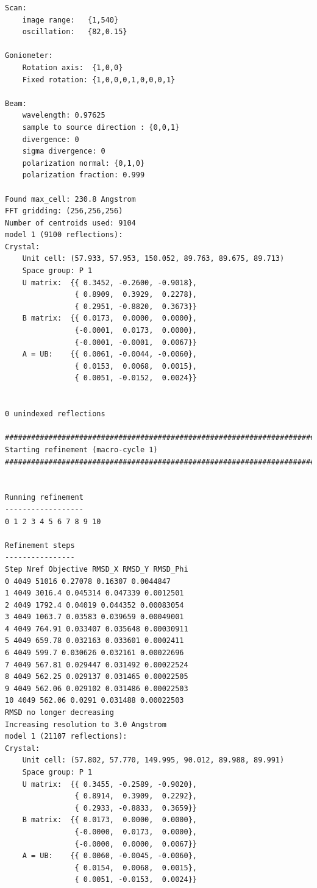 \documentclass[a4paper, 11pt]{article}
\begin{document}
{\begin{verbatim}
Scan:
    image range:   {1,540}
    oscillation:   {82,0.15}

Goniometer:
    Rotation axis:  {1,0,0}
    Fixed rotation: {1,0,0,0,1,0,0,0,1}

Beam:
    wavelength: 0.97625
    sample to source direction : {0,0,1}
    divergence: 0
    sigma divergence: 0
    polarization normal: {0,1,0}
    polarization fraction: 0.999

Found max_cell: 230.8 Angstrom
FFT gridding: (256,256,256)
Number of centroids used: 9104
model 1 (9100 reflections):
Crystal:
    Unit cell: (57.933, 57.953, 150.052, 89.763, 89.675, 89.713)
    Space group: P 1
    U matrix:  {{ 0.3452, -0.2600, -0.9018},
                { 0.8909,  0.3929,  0.2278},
                { 0.2951, -0.8820,  0.3673}}
    B matrix:  {{ 0.0173,  0.0000,  0.0000},
                {-0.0001,  0.0173,  0.0000},
                {-0.0001, -0.0001,  0.0067}}
    A = UB:    {{ 0.0061, -0.0044, -0.0060},
                { 0.0153,  0.0068,  0.0015},
                { 0.0051, -0.0152,  0.0024}}


0 unindexed reflections

################################################################################
Starting refinement (macro-cycle 1)
################################################################################


Running refinement
------------------
0 1 2 3 4 5 6 7 8 9 10

Refinement steps
----------------
Step Nref Objective RMSD_X RMSD_Y RMSD_Phi
0 4049 51016 0.27078 0.16307 0.0044847 
1 4049 3016.4 0.045314 0.047339 0.0012501 
2 4049 1792.4 0.04019 0.044352 0.00083054 
3 4049 1063.7 0.03583 0.039659 0.00049001 
4 4049 764.91 0.033407 0.035648 0.00030911 
5 4049 659.78 0.032163 0.033601 0.0002411 
6 4049 599.7 0.030626 0.032161 0.00022696 
7 4049 567.81 0.029447 0.031492 0.00022524 
8 4049 562.25 0.029137 0.031465 0.00022505 
9 4049 562.06 0.029102 0.031486 0.00022503 
10 4049 562.06 0.0291 0.031488 0.00022503 
RMSD no longer decreasing
Increasing resolution to 3.0 Angstrom
model 1 (21107 reflections):
Crystal:
    Unit cell: (57.802, 57.770, 149.995, 90.012, 89.988, 89.991)
    Space group: P 1
    U matrix:  {{ 0.3455, -0.2589, -0.9020},
                { 0.8914,  0.3909,  0.2292},
                { 0.2933, -0.8833,  0.3659}}
    B matrix:  {{ 0.0173,  0.0000,  0.0000},
                {-0.0000,  0.0173,  0.0000},
                {-0.0000,  0.0000,  0.0067}}
    A = UB:    {{ 0.0060, -0.0045, -0.0060},
                { 0.0154,  0.0068,  0.0015},
                { 0.0051, -0.0153,  0.0024}}



\end{verbatim}}
\end{document}
